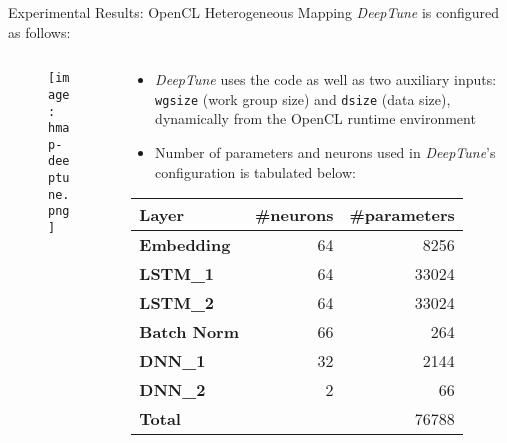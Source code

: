 \documentclass[10pt]{beamer}
\begin{document}
\begin{frame}{Experimental Results: OpenCL Heterogeneous Mapping}
\emph{DeepTune} is configured as follows:
\begin{columns}
\begin{column}{0.5\textwidth}
\begin{figure}[H]
\centering
\texttt{[image: hmap-deeptune.png]}
\end{figure}
\end{column}
\hfill
\begin{column}{0.5\textwidth}
\begin{itemize}
\item{\emph{DeepTune} uses the code as well as two auxiliary inputs: \texttt{wgsize} (work group size) and \texttt{dsize} (data size), dynamically from the OpenCL runtime environment}
\item{Number of parameters and neurons used in \emph{DeepTune}'s configuration is tabulated below:}
\end{itemize}
\begin{tabular}{|l|r|r|}
\hline
\small \textbf{Layer} & \small\#neurons & \small\#parameters \\
\hline
\small \textbf{Embedding} & \small 64 & \small 8256 \\
\small \textbf{LSTM\_1} & \small 64 & \small 33024 \\
\small \textbf{LSTM\_2} & \small 64 & \small 33024 \\
\small \textbf{Batch Norm} & \small 66 & \small 264 \\
\small \textbf{DNN\_1} & \small 32 & \small 2144 \\
\small \textbf{DNN\_2} & \small 2 & \small 66 \\
\hline
\small \textbf{Total} & & \small 76788 \\
\hline
\end{tabular}
\end{column}
\end{columns}
\end{frame}
\end{document}
